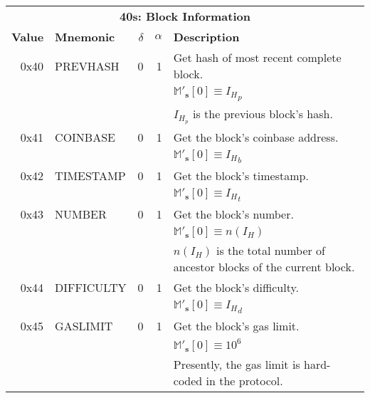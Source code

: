 \documentclass[9pt,oneside]{amsart}
\begin{document}
\begin{tabular*}{\columnwidth}[h]{rlrrl}
\toprule
\multicolumn{5}{c}{\textbf{40s: Block Information}} \vspace{5pt} \\
\textbf{Value} & \textbf{Mnemonic} & $\delta$ & $\alpha$ & \textbf{Description} \vspace{5pt} \\
0x40 & {\small PREVHASH} & 0 & 1 & Get hash of most recent complete block. \\
&&&& $\mathbb{M}'_\mathbf{s}[0] \equiv {I_H}_p$ \\
&&&& $I_{H_p}$ is the previous block's hash. \\
\midrule
0x41 & {\small COINBASE} & 0 & 1 & Get the block's coinbase address. \\
&&&& $\mathbb{M}'_\mathbf{s}[0] \equiv {I_H}_b$ \\
\midrule
0x42 & {\small TIMESTAMP} & 0 & 1 & Get the block's timestamp. \\
&&&& $\mathbb{M}'_\mathbf{s}[0] \equiv {I_H}_t$ \\
\midrule
0x43 & {\small NUMBER} & 0 & 1 & Get the block's number. \\
&&&& $\mathbb{M}'_\mathbf{s}[0] \equiv n({I_H})$ \\
&&&& $n(I_H)$ is the total number of ancestor blocks of the current block. \\
\midrule
0x44 & {\small DIFFICULTY} & 0 & 1 & Get the block's difficulty. \\
&&&& $\mathbb{M}'_\mathbf{s}[0] \equiv {I_H}_d$ \\
\midrule
0x45 & {\small GASLIMIT} & 0 & 1 & Get the block's gas limit. \\
&&&& $\mathbb{M}'_\mathbf{s}[0] \equiv 10^6$ \\
&&&& Presently, the gas limit is hard-coded in the protocol. \\
\bottomrule
\end{tabular*}
\end{document}
